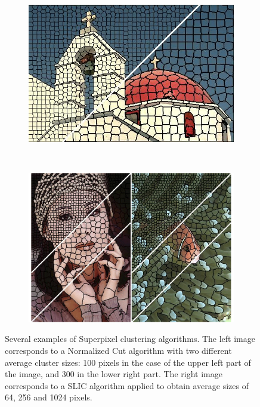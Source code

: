 \begin{figure}[htbp]
	\centering
    \begin{subfigure}[l]{0.51\textwidth}
        \centering
    	\includegraphics[width=\textwidth]
    	{figures/Superpixels-02.jpg}
    \end{subfigure}
    ~
    \begin{subfigure}[r]{0.47\textwidth}
	    \centering
   		\includegraphics[width=\textwidth]
    	{figures/Superpixels-03.png}
	\end{subfigure}
	\caption[Several examples of Superpixel clustering algorithms.]
	{Several examples of Superpixel clustering algorithms. The left image \cite{mori2005guiding} corresponds to a Normalized Cut algorithm with two different average cluster sizes: 100 pixels in the case of the upper left part of the image, and 300 in the lower right part. The right image \cite{achanta2012slic}
	 corresponds to a SLIC algorithm \cite{achanta2010slic} applied to obtain average sizes of 64, 256 and 1024 pixels.}
    \label{fig:generic_superpixels}
\end{figure}

